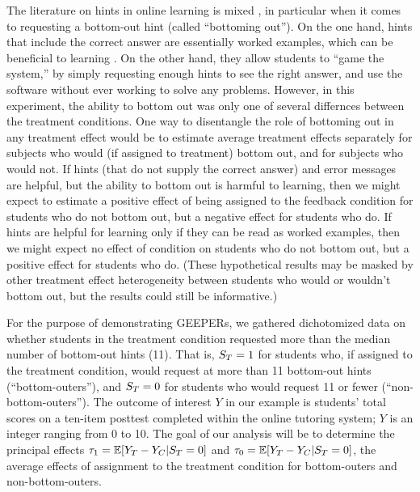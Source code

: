 \documentclass[11pt]{article} %
\begin{document}
The literature on hints in online learning is mixed \citep{stuff}, in particular when it comes to requesting a bottom-out hint (called ``bottoming out''). On the one hand, hints that include the correct answer are essentially worked examples, which can be beneficial to learning \citep{workedexamplestuff}. On the other hand, they allow students to ``game the system,'' by simply requesting enough hints to see the right answer, and use the software without ever working to solve any problems. However, in this experiment, the ability to bottom out was only one of several differnces between the treatment conditions. One way to disentangle the role of bottoming out in any treatment effect would be to estimate average treatment effects separately for subjects who would (if assigned to treatment) bottom out, and for subjects who would not. If hints (that do not supply the correct answer) and error messages are helpful, but the ability to bottom out is harmful to learning, then we might expect to estimate a positive effect of being assigned to the feedback condition for students who do not bottom out, but a negative effect for students who do. If hints are helpful for learning only if they can be read as worked examples, then we might expect no effect of condition on students who do not bottom out, but a positive effect for students who do. (These hypothetical results may be masked by other treatment effect heterogeneity between students who would or wouldn't bottom out, but the results could still be informative.)

For the purpose of demonstrating GEEPERs, we gathered dichotomized data on %
whether students in the treatment condition requested more than the median number of bottom-out hints (11).
That is, $S_T=1$ for students who, if assigned to the treatment condition, would request at more than 11 bottom-out hints (``bottom-outers''), and $S_T=0$ for students who would request 11 or fewer (``non-bottom-outers''). %
The outcome of interest $Y$ in our example is students' total scores on a ten-item posttest completed within the online tutoring system; $Y$ is an integer ranging from 0 to 10.
The goal of our analysis will be to determine the principal effects $\tau_1=\mathbb{E}[Y_T-Y_C|S_T=0]$ and $\tau_0=\mathbb{E}[Y_T-Y_C|S_T=0]$, the average effects of assignment to the treatment condition for bottom-outers and non-bottom-outers.
\end{document}
